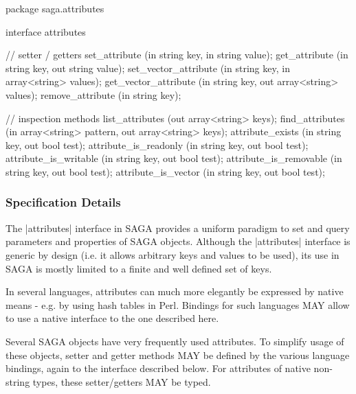  \begin{myspec}
  package saga.attributes
  {
    interface attributes
    {
      // setter / getters
      set_attribute           (in  string          key,
                               in  string          value);
      get_attribute           (in  string          key,
                               out string          value);
      set_vector_attribute    (in  string          key,
                               in  array<string>   values);
      get_vector_attribute    (in  string          key,
                               out array<string>   values);
      remove_attribute        (in  string          key);
 
      // inspection methods
      list_attributes         (out array<string>   keys);
      find_attributes         (in  array<string>   pattern,
                               out array<string>   keys);
      attribute_exists        (in  string          key,
                               out bool            test);
      attribute_is_readonly   (in  string          key,
                               out bool            test);
      attribute_is_writable   (in  string          key,
                               out bool            test);
      attribute_is_removable  (in  string          key,
                               out bool            test);
      attribute_is_vector     (in  string          key,
                               out bool            test);
    }
  }
 \end{myspec}
 
 \subsubsection{Specification Details}
 
  The |attributes| interface in SAGA provides a uniform paradigm
  to set and query parameters and properties of SAGA objects.
  Although the |attributes| interface is generic by design (i.e.
  it allows arbitrary keys and values to be used), its use in
  SAGA is mostly limited to a finite and well defined set of
  keys.
 
  In several languages, attributes can much more elegantly
  be expressed by native means - e.g. by using hash
  tables in Perl.  Bindings for such languages MAY allow to use
  a native interface  to the one described here.
 
  Several SAGA objects have very frequently used attributes.  To
  simplify usage of these objects, setter and getter methods MAY
  be defined by the various language bindings, again
   to the interface described below.  For
  attributes of native non-string types, these setter/getters
  MAY be typed.
 
